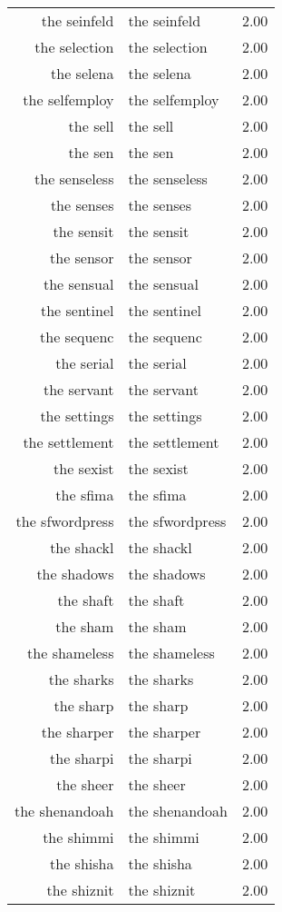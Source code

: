 \begin{table}[ht]
\begin{tabular}{rlr}
  the seinfeld & the seinfeld & 2.00 \\ 
  the selection & the selection & 2.00 \\ 
  the selena & the selena & 2.00 \\ 
  the selfemploy & the selfemploy & 2.00 \\ 
  the sell & the sell & 2.00 \\ 
  the sen & the sen & 2.00 \\ 
  the senseless & the senseless & 2.00 \\ 
  the senses & the senses & 2.00 \\ 
  the sensit & the sensit & 2.00 \\ 
  the sensor & the sensor & 2.00 \\ 
  the sensual & the sensual & 2.00 \\ 
  the sentinel & the sentinel & 2.00 \\ 
  the sequenc & the sequenc & 2.00 \\ 
  the serial & the serial & 2.00 \\ 
  the servant & the servant & 2.00 \\ 
  the settings & the settings & 2.00 \\ 
  the settlement & the settlement & 2.00 \\ 
  the sexist & the sexist & 2.00 \\ 
  the sfima & the sfima & 2.00 \\ 
  the sfwordpress & the sfwordpress & 2.00 \\ 
  the shackl & the shackl & 2.00 \\ 
  the shadows & the shadows & 2.00 \\ 
  the shaft & the shaft & 2.00 \\ 
  the sham & the sham & 2.00 \\ 
  the shameless & the shameless & 2.00 \\ 
  the sharks & the sharks & 2.00 \\ 
  the sharp & the sharp & 2.00 \\ 
  the sharper & the sharper & 2.00 \\ 
  the sharpi & the sharpi & 2.00 \\ 
  the sheer & the sheer & 2.00 \\ 
  the shenandoah & the shenandoah & 2.00 \\ 
  the shimmi & the shimmi & 2.00 \\ 
  the shisha & the shisha & 2.00 \\ 
  the shiznit & the shiznit & 2.00 \\ 

\end{tabular}
\end{table}
